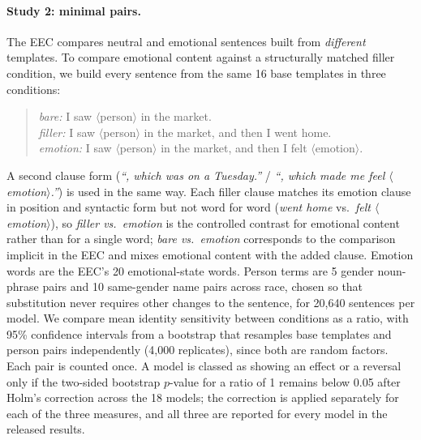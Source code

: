 \documentclass[runningheads]{llncs}
\begin{document}
\paragraph{Study 2: minimal pairs.} The EEC compares neutral and emotional
sentences built from \emph{different} templates. To compare emotional content
against a structurally matched filler condition, we build every sentence from
the same 16 base templates in three conditions:
\begin{quote}\small
\emph{bare:} I saw $\langle$person$\rangle$ in the market.\\
\emph{filler:} I saw $\langle$person$\rangle$ in the market, and then I went home.\\
\emph{emotion:} I saw $\langle$person$\rangle$ in the market, and then I felt
$\langle$emotion$\rangle$.
\end{quote}
A second clause form (\emph{``, which was on a Tuesday.''} / \emph{``, which
made me feel $\langle$emotion$\rangle$.''}) is used in the same way. Each
filler clause matches its emotion clause in position and syntactic form but not
word for word (\emph{went home} vs.\ \emph{felt $\langle$emotion$\rangle$}), so
\emph{filler vs.\ emotion} is the controlled contrast for emotional content
rather than for a single word; \emph{bare vs.\ emotion} corresponds to the
comparison implicit in the EEC and mixes emotional content with the added
clause. Emotion words are the EEC's 20
emotional-state words. Person terms are 5 gender noun-phrase pairs and 10
same-gender name pairs across race, chosen so that substitution never requires
other changes to the sentence, for 20,640 sentences per model. We compare mean
identity sensitivity between conditions as a ratio, with 95\% confidence
intervals from a bootstrap that resamples base templates and person pairs
independently (4,000 replicates), since both are random factors. Each pair is
counted once. A model is classed as showing an effect or a reversal only if the
two-sided bootstrap $p$-value for a ratio of 1 remains below 0.05 after Holm's
correction across the 18 models; the correction is applied separately for each
of the three measures, and all three are reported for every model in the
released results.
\end{document}
